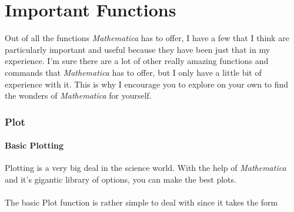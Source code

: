 \documentclass[11pt,a4paper,twoside]{article}
\begin{document}
%		
%			
%			
%			
%		
%			
%				
%					
%				
%					
%				
%					
%				
%					
%				
%			
			
\newpage
			
	\part{Important Functions}
	
		Out of all the functions \textit{Mathematica} has to offer, I have a few that I think are particularly important and useful because they have been just that in my experience.  I'm sure there are a lot of other really amazing functions and commands that \textit{Mathematica} has to offer, but I only have a little bit of experience with it.  This is why I encourage you to explore on your own to find the wonders of \textit{Mathematica} for yourself.
		
		\section{Plot}
		
			\subsection{Basic Plotting}
		
				Plotting is a very big deal in the science world.  With the help of \textit{Mathematica} and it's gigantic library of options, you can make the best plots.
				\\
				\\
				The basic Plot function is rather simple to deal with since it takes the form
			
\end{document}
